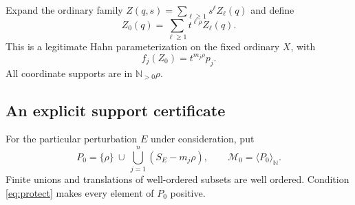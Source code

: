 \documentclass[11pt,letterpaper]{article}
\theoremstyle{definition}
\theoremstyle{remark}
\newcommand{\N}{\mathbb N}\newcommand{\Z}{\mathbb Z}\newcommand{\Q}{\mathbb Q}
\newcommand{\powers}[1]{\langle #1\rangle_{\N}}
\numberwithin{equation}{section}
\begin{document}
Expand the ordinary family
$Z(q,s)=\sum_{\ell\geq1}s^\ell Z_\ell(q)$ and define
\begin{equation}\label{eq:Z0}
 Z_0(q)=\sum_{\ell\geq1}t^{\ell\rho}Z_\ell(q).
\end{equation}
This is a legitimate Hahn parameterization on the fixed ordinary $X$, with
\[
 f_j(Z_0)=t^{m_j\rho}p_j.
\]
All coordinate supports are in $\N_{>0}\rho$.

\subsection{An explicit support certificate}
For the particular perturbation $E$ under consideration, put
\begin{equation}\label{eq:P0}
 P_0=\{\rho\}\ \cup\ \bigcup_{j=1}^n(S_E-m_j\rho),
 \qquad \mathcal M_0=\powers{P_0}.
\end{equation}
Finite unions and translations of well-ordered subsets are well ordered.
Condition \eqref{eq:protect} makes every element of $P_0$ positive.
\end{document}
